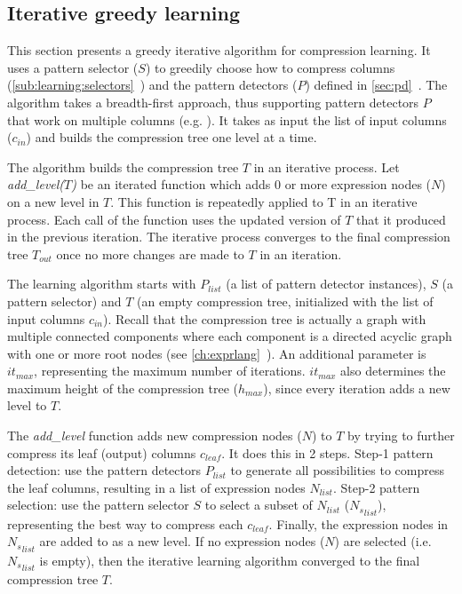 \subsection{Iterative greedy learning}
\label{sub:learning:iterative}





% 

This section presents a greedy iterative algorithm for compression learning. It uses a pattern selector (\(S\)) to greedily choose how to compress columns (\ref{sub:learning:selectors}~) and the pattern detectors (\(P\)) defined in \ref{sec:pd}~. The algorithm takes a breadth-first approach, thus supporting pattern detectors \(P\) that work on multiple columns (e.g. ). It takes as input the list of input columns (\(c_{in}\)) and builds the compression tree one level at a time.

The algorithm builds the compression tree \(T\) in an iterative process. Let \textit{add\_level(\(T\))} be an iterated function which adds 0 or more expression nodes (\(N\)) on a new level in \(T\). This function is repeatedly applied to T in an iterative process. Each call of the function uses the updated version of \(T\) that it produced in the previous iteration. The iterative process converges to the final compression tree \(T_{out}\) once no more changes are made to \(T\) in an iteration.

The learning algorithm starts with \(P_{list}\) (a list of pattern detector instances), \(S\) (a pattern selector) and \(T\) (an empty compression tree, initialized with the list of input columns \(c_{in}\)). Recall that the compression tree is actually a graph with multiple connected components where each component is a directed acyclic graph with one or more root nodes (see \ref{ch:exprlang}~). An additional parameter is \(it_{max}\), representing the maximum number of iterations. \(it_{max}\) also determines the maximum height of the compression tree (\(h_{max}\)), since every iteration adds a new level to \(T\).

The \textit{add\_level} function adds new compression nodes (\(N\)) to \(T\) by trying to further compress its leaf (output) columns \(c_{leaf}\). It does this in 2 steps. Step-1 pattern detection: use the pattern detectors \(P_{list}\) to generate all possibilities to compress the leaf columns, resulting in a list of expression nodes \(N_{list}\). Step-2 pattern selection: use the pattern selector \(S\) to select a subset of \(N_{list}\) (\({N_{s}}_{list}\)), representing the best way to compress each \(c_{leaf}\). Finally, the expression nodes in \({N_{s}}_{list}\) are added to as a new level. If no expression nodes (\(N\)) are selected (i.e. \({N_{s}}_{list}\) is empty), then the iterative learning algorithm converged to the final compression tree \(T\).

